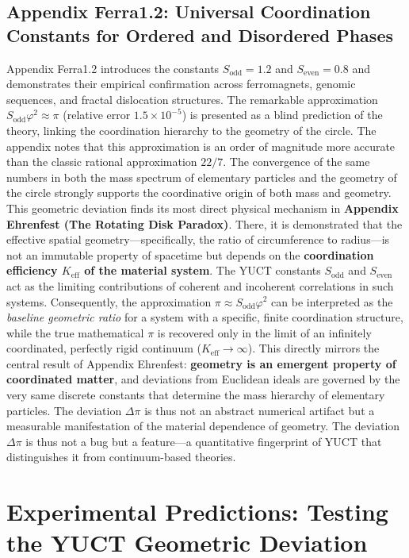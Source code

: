\documentclass[12pt,a4paper]{article}
\begin{document}
{	\subsection{Appendix Ferra1.2: Universal Coordination Constants for Ordered and Disordered Phases}
	
	Appendix Ferra1.2 introduces the constants \(S_{\mathrm{odd}}=1.2\) and \(S_{\mathrm{even}}=0.8\) and demonstrates their empirical confirmation across ferromagnets, genomic sequences, and fractal dislocation structures. The remarkable approximation \(S_{\mathrm{odd}}\varphi^2 \approx \pi\) (relative error \(1.5\times10^{-5}\)) is presented as a blind prediction of the theory, linking the coordination hierarchy to the geometry of the circle. The appendix notes that this approximation is an order of magnitude more accurate than the classic rational approximation \(22/7\). The convergence of the same numbers in both the mass spectrum of elementary particles and the geometry of the circle strongly supports the coordinative origin of both mass and geometry. This geometric deviation finds its most direct physical mechanism in \textbf{Appendix Ehrenfest (The Rotating Disk Paradox)}. There, it is demonstrated that the effective spatial geometry—specifically, the ratio of circumference to radius—is not an immutable property of spacetime but depends on the \textbf{coordination efficiency \(K_{\mathrm{eff}}\) of the material system}. The YUCT constants \(S_{\mathrm{odd}}\) and \(S_{\mathrm{even}}\) act as the limiting contributions of coherent and incoherent correlations in such systems. Consequently, the approximation \(\pi \approx S_{\mathrm{odd}}\varphi^2\) can be interpreted as the \textit{baseline geometric ratio} for a system with a specific, finite coordination structure, while the true mathematical \(\pi\) is recovered only in the limit of an infinitely coordinated, perfectly rigid continuum (\(K_{\mathrm{eff}} \to \infty\)). This directly mirrors the central result of Appendix Ehrenfest: \textbf{geometry is an emergent property of coordinated matter}, and deviations from Euclidean ideals are governed by the very same discrete constants that determine the mass hierarchy of elementary particles. The deviation \(\Delta\pi\) is thus not an abstract numerical artifact but a measurable manifestation of the material dependence of geometry.
	 The deviation \(\Delta\pi\) is thus not a bug but a feature—a quantitative fingerprint of YUCT that distinguishes it from continuum-based theories.
	
	\section{Experimental Predictions: Testing the YUCT Geometric Deviation}
	
}
\end{document}
